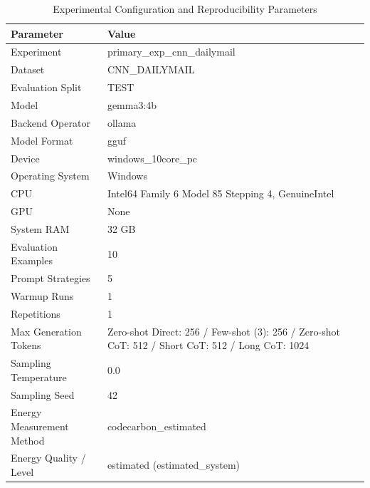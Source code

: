\begin{table}
\caption{Experimental Configuration and Reproducibility Parameters}
\label{tab:experimental_configuration}
\begin{tabular}{ll}
\toprule
Parameter & Value \\
\midrule
Experiment & primary\_exp\_cnn\_dailymail \\
Dataset & CNN\_DAILYMAIL \\
Evaluation Split & TEST \\
Model & gemma3:4b \\
Backend Operator & ollama \\
Model Format & gguf \\
Device & windows\_10core\_pc \\
Operating System & Windows \\
CPU & Intel64 Family 6 Model 85 Stepping 4, GenuineIntel \\
GPU & None \\
System RAM & 32 GB \\
Evaluation Examples & 10 \\
Prompt Strategies & 5 \\
Warmup Runs & 1 \\
Repetitions & 1 \\
Max Generation Tokens & Zero-shot Direct: 256 / Few-shot (3): 256 / Zero-shot CoT: 512 / Short CoT: 512 / Long CoT: 1024 \\
Sampling Temperature & 0.0 \\
Sampling Seed & 42 \\
Energy Measurement Method & codecarbon\_estimated \\
Energy Quality / Level & estimated (estimated\_system) \\
\bottomrule
\end{tabular}
\end{table}
